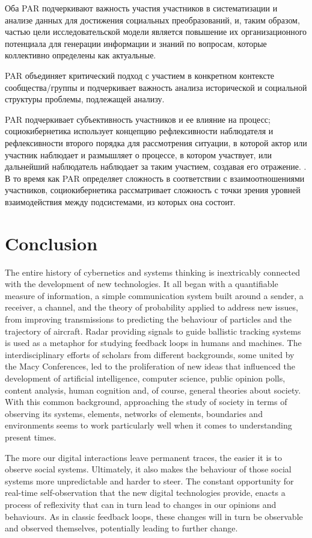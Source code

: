 \documentclass[a4page]{article}
\begin{document}
Оба PAR подчеркивают важность участия участников в систематизации и анализе данных для достижения социальных преобразований, и, таким образом, частью цели исследовательской модели является повышение их организационного потенциала для генерации информации и знаний по вопросам, которые коллективно определены как актуальные.

PAR объединяет критический подход с участием в конкретном контексте сообщества/группы и подчеркивает важность анализа исторической и социальной структуры проблемы, подлежащей анализу.

PAR подчеркивает субъективность участников и ее влияние на процесс; социокибернетика использует концепцию рефлексивности наблюдателя и рефлексивности второго порядка для рассмотрения ситуации, в которой актор или участник наблюдает и размышляет о процессе, в котором участвует, или дальнейший наблюдатель наблюдает за таким участием, создавая его отражение. . В то время как PAR определяет сложность в соответствии с взаимоотношениями участников, социокибернетика рассматривает сложность с точки зрения уровней взаимодействия между подсистемами, из которых она состоит.

\newpage
\section{Conclusion}

The entire history of cybernetics and systems thinking is inextricably connected with the development of new technologies. It all began with a quantifiable measure of information, a simple communication system built around a sender, a receiver, a channel, and the theory of probability applied to address new issues, from improving transmissions to predicting the behaviour of particles and the trajectory of aircraft. Radar providing signals to guide ballistic tracking systems is used as a metaphor for studying feedback loops in humans and machines. The interdisciplinary efforts of scholars from different backgrounds, some united by the Macy Conferences, led to the proliferation of new ideas that influenced the development of artificial intelligence, computer science, public opinion polls, content analysis, human cognition and, of course, general theories about society. With this common background, approaching the study of society in terms of observing its systems, elements, networks of elements, boundaries and environments seems to work particularly well when it comes to understanding present times.

The more our digital interactions leave permanent traces, the easier it is to observe social systems. Ultimately, it also makes the behaviour of those social systems more unpredictable and harder to steer. The constant opportunity for real-time self-observation that the new digital technologies provide, enacts a process of reflexivity that can in turn lead to changes in our opinions and behaviours. As in classic feedback loops, these changes will in turn be observable and observed themselves, potentially leading to further change.
\end{document}

